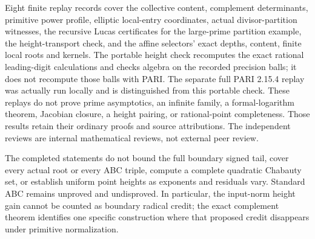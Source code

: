 Eight finite replay records cover the collective content, complement
determinants, primitive power profile, elliptic local-entry coordinates,
actual divisor-partition witnesses, the recursive Lucas certificates for
the large-prime partition example, the height-transport check, and the
affine selectors' exact depths, content, finite local roots and kernels.
The portable height check recomputes the exact rational leading-digit
calculations and checks algebra on the recorded precision balls; it does
not recompute those balls with PARI. The separate full PARI 2.15.4 replay
was actually run locally and is distinguished from this portable check.
These replays do not prove prime
asymptotics, an infinite family, a formal-logarithm theorem, Jacobian
closure, a height pairing, or rational-point completeness. Those results
retain their ordinary proofs and source attributions. The independent
reviews are internal mathematical reviews, not external peer review.

The completed statements do not bound the full boundary signed tail,
cover every actual root or every ABC triple, compute a complete quadratic
Chabauty set, or establish uniform point heights as exponents and residuals
vary. Standard ABC remains unproved and undisproved. In particular, the
input-norm height gain cannot be counted as boundary radical credit;
the exact complement theorem identifies one specific construction where
that proposed credit disappears under primitive normalization.
